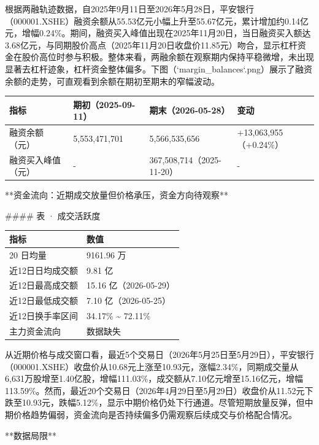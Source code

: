 \documentclass[12pt,a4paper]{article}
\begin{document}
根据两融轨迹数据，自2025年9月11日至2026年5月28日，平安银行（000001.XSHE）融资余额从55.53亿元小幅上升至55.67亿元，累计增加约0.14亿元，增幅0.24\%。期间，融资买入峰值出现在2025年11月20日，当日融资买入额达3.68亿元，与同期股价高点（2025年11月20日收盘价11.85元）吻合，显示杠杆资金在股价高位时参与积极。整体来看，两融余额在观察期内保持平稳微增，未出现显著去杠杆迹象，杠杆资金整体偏多。下图（`margin\_balances`.png）展示了融资余额的走势，可直观看到余额在期初至期末的窄幅波动。

\begin{table}[htbp]
\centering
\begin{tabular}{llll}
\toprule
指标 & 期初（2025-09-11） & 期末（2026-05-28） & 变动 \\
\midrule
融资余额（元） & 5,553,471,701 & 5,566,535,656 & +13,063,955（+0.24\%） \\
融资买入峰值（元） & - & 367,508,714（2025-11-20） & - \\
\bottomrule
\end{tabular}
\end{table}


**资金流向：近期成交放量但价格承压，资金方向待观察**

\#\#\#\# 表 · 成交活跃度

\begin{table}[htbp]
\centering
\begin{tabular}{ll}
\toprule
指标 & 数值 \\
\midrule
20 日均量 & 9161.96 万 \\
近12日日均成交额 & 9.81 亿 \\
近12日最高成交额 & 15.16 亿（2026-05-29） \\
近12日最低成交额 & 7.10 亿（2026-05-25） \\
近12日换手率区间 & 34.17\% \textasciitilde{} 72.11\% \\
主力资金流向 & 数据缺失 \\
\bottomrule
\end{tabular}
\end{table}


从近期价格与成交窗口看，最近5个交易日（2026年5月25日至5月29日），平安银行（000001.XSHE）收盘价从10.68元上涨至10.93元，涨幅2.34\%，同期成交量从6,631万股增至1.40亿股，增幅111.03\%，成交额从7.10亿元增至15.16亿元，增幅113.59\%。然而，最近20个交易日（2026年4月29日至5月29日）收盘价从11.52元下跌至10.93元，跌幅5.12\%，显示中期价格仍处下行通道。尽管短期放量反弹，但中期价格趋势偏弱，资金流向是否持续偏多仍需观察后续成交与价格配合情况。

**数据局限**
\end{document}
